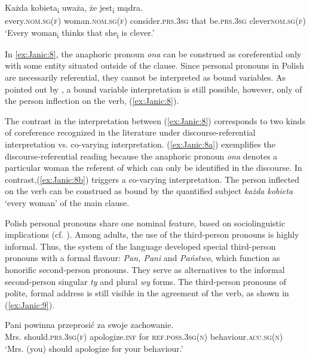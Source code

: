 \documentclass[output=paper]{langscibook}
\begin{document}
\ex \label{ex:Janic:8b}
\gll Każda	 kobieta\textsubscript{i} uważa, 	 że	 jest\textsubscript{i}		mądra.\\
 every.\textsc{nom.sg(f)} woman.\textsc{nom.sg(f)}	consider.\textsc{prs.3sg}	that	be.\textsc{prs.3sg} clever\textsc{nom.sg(f)}\\
\glt ‘Every woman\textsubscript{i} thinks that she\textsubscript{i} is clever.’ \citep[11]{Siewierska2004}
\z
\z

In \ref{ex:Janic:8}, the anaphoric pronoun \textit{ona} can be construed as coreferential only with some entity situated outside of the clause. Since personal pronouns in Polish are necessarily referential, they cannot be interpreted as bound variables. As pointed out by \citet{Siewierska2004}, a bound variable interpretation is still possible, however, only of the person inflection on the verb, (\ref{ex:Janic:8}). 

The contrast in the interpretation between (\ref{ex:Janic:8}) corresponds to two kinds of coreference recognized in the literature under discourse-referential interpretation vs. co-varying interpretation. (\ref{ex:Janic:8a}) exemplifies the discourse-referential reading because the anaphoric pronoun \textit{ona} denotes a particular woman the referent of which can only be identified in the discourse. In contrast,(\ref{ex:Janic:8b}) triggers a co-varying interpretation. The person inflected on the verb can be construed as bound by the quantified subject \textit{każda kobieta} ‘every woman’ of the main clause. 

Polish personal pronouns share one nominal feature, based on sociolinguistic implications (cf. \citealt{Siewierska2004}). Among adults, the use of the third-person pronouns is highly informal. Thus, the system of the language developed special third-person pronouns with a formal flavour: \textit{Pan, Pani} and \textit{Państwo}, which function as honorific second-person pronouns. They serve as alternatives to the informal second-person singular \textit{ty} and plural \textit{wy} forms. The third-person pronouns of polite, formal address is still visible in the agreement of the verb, as shown in (\ref{ex:Janic:9}).

\ea \label{ex:Janic:9}
\gll Pani	 powinna	 przeprosić	 za	swoje		 zachowanie.\\
	 Mrs. 	should.\textsc{prs.3sg(f)}	apologize.\textsc{inf}	for	\textsc{ref.poss.3sg(n)}	behaviour.\textsc{acc.sg(n)} \\
\glt ‘Mrs. (you) should apologize for your behaviour.’
\z
	
\end{document}
